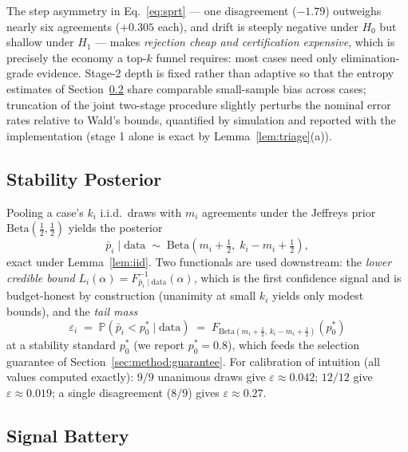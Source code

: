 \documentclass[11pt]{article}
\newcommand{\pbar}{\bar{p}}
\newcommand{\Prob}{\mathbb{P}}
\newcommand{\Betadist}{\mathrm{Beta}}
\begin{document}
The step asymmetry in Eq.~\eqref{eq:sprt} --- one disagreement
($-1.79$) outweighs nearly six agreements ($+0.305$ each), and drift is
steeply negative under $H_0$ but shallow under $H_1$ --- makes
\emph{rejection cheap and certification expensive}, which is precisely
the economy a top-$k$ funnel requires: most cases need only
elimination-grade evidence. Stage-2 depth is fixed rather than adaptive
so that the entropy estimates of Section~\ref{sec:method:signals} share
comparable small-sample bias across cases; truncation of the joint
two-stage procedure slightly perturbs the nominal error rates relative
to Wald's bounds, quantified by simulation and reported with the
implementation (stage 1 alone is exact by Lemma~\ref{lem:triage}(a)).

\subsection{Stability Posterior}
\label{sec:method:posterior}

Pooling a case's $k_i$ i.i.d.\ draws with $m_i$ agreements under the
Jeffreys prior $\Betadist(\tfrac12, \tfrac12)$ yields the posterior
\begin{equation}
  \pbar_i \mid \text{data} \;\sim\;
  \Betadist\!\left(m_i + \tfrac12,\; k_i - m_i + \tfrac12\right),
  \label{eq:posterior}
\end{equation}
exact under Lemma~\ref{lem:iid}. Two functionals are used downstream:
the \emph{lower credible bound} $L_i(\alpha) =
F^{-1}_{\pbar_i \mid \text{data}}(\alpha)$, which is the first
confidence signal and is budget-honest by construction (unanimity at
small $k_i$ yields only modest bounds), and the \emph{tail mass}
\begin{equation}
  \varepsilon_i \;=\; \Prob\!\left(\pbar_i < p_0^{\ast} \mid
  \text{data}\right)
  \;=\; F_{\Betadist(m_i + \frac12,\, k_i - m_i + \frac12)}(p_0^{\ast})
  \label{eq:eps}
\end{equation}
at a stability standard $p_0^{\ast}$ (we report $p_0^{\ast} = 0.8$),
which feeds the selection guarantee of
Section~\ref{sec:method:guarantee}. For calibration of intuition (all
values computed exactly): $9/9$ unanimous draws give $\varepsilon
\approx 0.042$; $12/12$ give $\varepsilon \approx 0.019$; a single
disagreement ($8/9$) gives $\varepsilon \approx 0.27$.

\subsection{Signal Battery}
\label{sec:method:signals}
\end{document}
